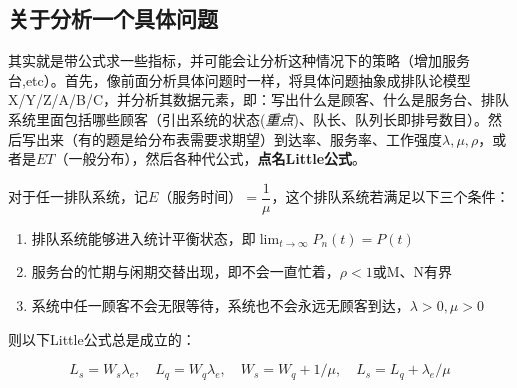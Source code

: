 \documentclass[]{report}
\begin{document}
		\subsection{关于分析一个具体问题}
		其实就是带公式求一些指标，并可能会让分析这种情况下的策略（增加服务台,etc）。首先，像前面分析具体问题时一样，将具体问题抽象成排队论模型X/Y/Z/A/B/C，并分析其数据元素，即：写出什么是顾客、什么是服务台、排队系统里面包括哪些顾客（引出系统的状态(\textit{重点})、队长、队列长即排号数目）。然后写出来（有的题是给分布表需要求期望）到达率、服务率、工作强度$\lambda,\mu,\rho$，或者是$ET$（一般分布），然后各种代公式，\textbf{点名Little公式}。\par
		\begin{theorem}
			对于任一排队系统，记$E$（服务时间）$=\dfrac1\mu$，这个排队系统若满足以下三个条件：\par
			\begin{enumerate}
				\item 排队系统能够进入统计平衡状态，即$\displaystyle\lim_{t\to\infty}P_n(t)=P(t)$
				\item 服务台的忙期与闲期交替出现，即不会一直忙着，$\rho<1$或M、N有界
				\item 系统中任一顾客不会无限等待，系统也不会永远无顾客到达，$\lambda>0,\mu>0$
			\end{enumerate}\par
			则以下Little公式总是成立的：\par
			\[L_s=W_s\lambda_e,\quad L_q=W_q\lambda_e,\quad W_s=W_q+1/\mu,\quad L_s=L_q+\lambda_e/\mu\]
		\end{theorem}
\end{document}
